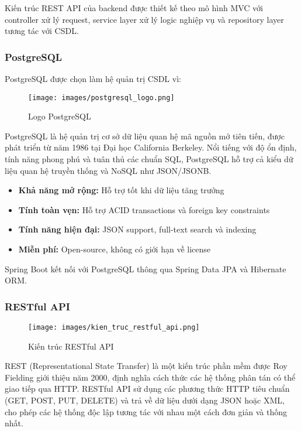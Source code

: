 Kiến trúc REST API của backend được thiết kế theo mô hình MVC với controller xử lý request, service layer xử lý logic nghiệp vụ và repository layer tương tác với CSDL.

\subsubsection{PostgreSQL}
PostgreSQL được chọn làm hệ quản trị CSDL vì:

\begin{figure}[H]
\centering
\texttt{[image: images/postgresql\_logo.png]}
\caption{Logo PostgreSQL}
\end{figure}

PostgreSQL là hệ quản trị cơ sở dữ liệu quan hệ mã nguồn mở tiên tiến, được phát triển từ năm 1986 tại Đại học California Berkeley. Nổi tiếng với độ ổn định, tính năng phong phú và tuân thủ các chuẩn SQL, PostgreSQL hỗ trợ cả kiểu dữ liệu quan hệ truyền thống và NoSQL như JSON/JSONB.

\begin{itemize}[leftmargin=1cm]
    \item \textbf{Khả năng mở rộng:} Hỗ trợ tốt khi dữ liệu tăng trưởng
    \item \textbf{Tính toàn vẹn:} Hỗ trợ ACID transactions và foreign key constraints
    \item \textbf{Tính năng hiện đại:} JSON support, full-text search và indexing
    \item \textbf{Miễn phí:} Open-source, không có giới hạn về license
\end{itemize}

Spring Boot kết nối với PostgreSQL thông qua Spring Data JPA và Hibernate ORM.

\subsubsection{RESTful API}

\begin{figure}[H]
\centering
\texttt{[image: images/kien\_truc\_restful\_api.png]}
\caption{Kiến trúc RESTful API}
\end{figure}

REST (Representational State Transfer) là một kiến trúc phần mềm được Roy Fielding giới thiệu năm 2000, định nghĩa cách thức các hệ thống phân tán có thể giao tiếp qua HTTP. RESTful API sử dụng các phương thức HTTP tiêu chuẩn (GET, POST, PUT, DELETE) và trả về dữ liệu dưới dạng JSON hoặc XML, cho phép các hệ thống độc lập tương tác với nhau một cách đơn giản và thống nhất.

